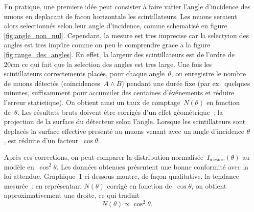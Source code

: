 \documentclass[a4paper,12pt,twoside]{article}
\begin{document}
En pratique, une premiere idée peut consister à faire varier l'angle d'incidence des muons en deplacant de facon horizontale les scintillateurs. Les muons seraient alors selectionnés selon leur angle d'incidence, comme schematisé en figure \ref{fig:angle_non_nul}. Cependant, la mesure est tres imprecise car la selectyion des angles est tres impûre comme on peu le comprendre grace a la figure \ref{fig:range_des_angles}. En effet, la largeur des scintillateurs est de l'ordre de 20cm ce qui fait que la selection des angles est tres large.
Une fois les scintillateurs correctements placés, pour chaque angle~$\theta$, on enregistre le nombre de muons détectés (coïncidences $A\wedge B$) pendant une durée fixe (par ex.\ quelques minutes, suffisamment pour accumuler des centaines d’événements et réduire l’erreur statistique). On obtient ainsi un taux de comptage~$N(\theta)$ en fonction de~$\theta$. Les résultats bruts doivent être corrigés d'un effet géométrique~: la projection de la surface du détecteur selon l'angle. Lorsque les scintillateurs sont deplacés la surface effective presenté au muons venant avec un angle d'incidence $\theta$, est réduite d'un facteur~$\cos\theta$. 

Après ces corrections, on peut comparer la distribution normalisée~$I_{\mathrm{mesure}}(\theta)$ au modèle en~$\cos^{2}\theta$. Les données obtenues présentent une bonne conformité avec la loi attendue. Graphique~1 ci‑dessous montre, de façon qualitative, la tendance mesurée~: en représentant $N(\theta)$ corrigé en fonction de~$\cos\theta$, on obtient approximativement une droite, ce qui traduit
\[
N(\theta)\propto\cos^{2}\theta.
\]
\end{document}
